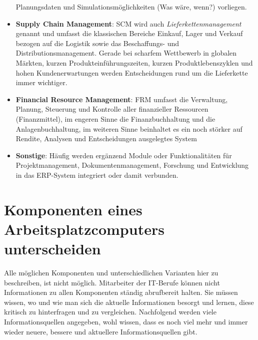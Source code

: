 \documentclass[a4paper, 12pt]{report}
\begin{document}
\begin{itemize}
        Planungsdaten und Simulationsmöglichkeiten (Was wäre, wenn?) vorliegen. 
    \item \textbf{Supply Chain Management}: SCM wird auch 
        \emph{Lieferkettenmanagement} genannt und umfasst die klassischen 
        Bereiche Einkauf, Lager und Verkauf bezogen auf die Logistik sowie das 
        Beschaffungs- und Distributionsmanagement. Gerade bei scharfem 
        Wettbewerb in globalen Märkten, kurzen Produkteinführungszeiten, kurzen 
        Produktlebenszyklen und hohen Kundenerwartungen werden Entscheidungen 
        rund um die Lieferkette immer wichtiger. 
    \item \textbf{Financial Resource Management}: FRM umfasst die Verwaltung, 
        Planung, Steuerung und Kontrolle aller finanzieller Ressourcen 
        (Finanzmittel), im engeren Sinne die Finanzbuchhaltung und die 
        Anlagenbuchhaltung, im weiteren Sinne beinhaltet es ein noch störker auf 
        Rendite, Analysen und Entscheidungen ausgelegtes System
    \item \textbf{Sonstige}: Häufig werden ergänzend Module oder 
        Funktionalitäten für Projektmanagement, Dokumentenmanagement, Forschung
        und Entwicklung in das ERP-System integriert oder damit verbunden. 
\end{itemize}

\newpage
\section{Komponenten eines Arbeitsplatzcomputers unterscheiden}

Alle möglichen Komponenten und unterschiedlichen Varianten hier zu beschreiben, 
ist nicht möglich. Mitarbeiter der IT-Berufe können nicht Informationen zu allen
Komponenten ständig abrufbereit halten. Sie müssen wissen, wo und wie man sich 
die aktuelle Informationen besorgt und lernen, diese kritisch zu hinterfragen 
und zu vergleichen. Nachfolgend werden viele Informationsquellen angegeben, wohl
wissen, dass es noch viel mehr und immer wieder neuere, bessere und aktuellere 
Informationsquellen gibt. \\
\end{document}
